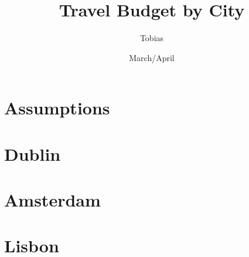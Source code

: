 \documentclass[12pt]{article}
\title{Travel Budget by City}
\author{Tobias}
\date{March/April}
\begin{document}
	\maketitle
	\section{Assumptions}
	
	\section{Dublin}
	
	\section{Amsterdam}
	
	\section{Lisbon}
\end{document}

